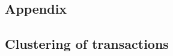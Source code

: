 
\begin{appendices}
\renewcommand{\appendixname}{APPENDIX}
\renewcommand{\appendixtocname}{\appendixname}
\addappheadtotoc


\part*{Appendix}

\chapter*{Clustering of transactions}
\label{cha:apdx_clustering_tx}



\end{appendices}
